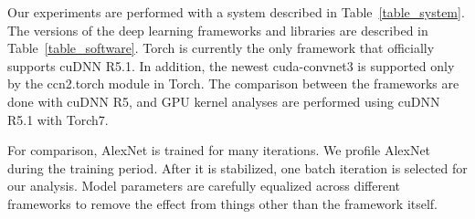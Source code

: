 Our experiments are performed with a system described in Table~\ref{table_system}. The versions of the deep learning frameworks and libraries are described in Table~\ref{table_software}. Torch is currently the only framework that officially supports cuDNN R5.1. In addition, the newest cuda-convnet3 is supported only by the ccn2.torch module in Torch. The comparison between the frameworks are done with cuDNN R5, and GPU kernel analyses are performed using cuDNN R5.1 with Torch7.

For comparison, AlexNet is trained for many iterations. We profile AlexNet during the training period. After it is stabilized, one batch iteration is selected for our analysis. Model parameters are carefully equalized across different frameworks to remove the effect from things other than the framework itself.